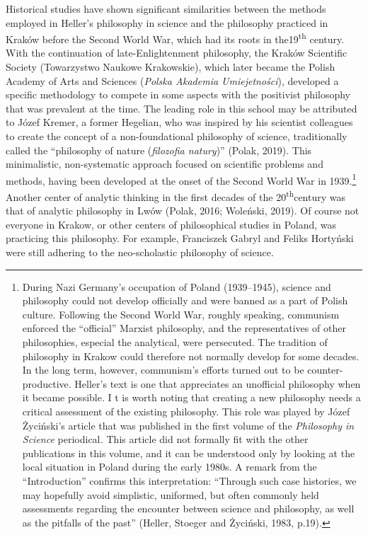 \documentclass[a4paper]{article}
\newcommand\textstyleFootnoteAnchor[1]{\textsuperscript{#1}}
\begin{document}
Historical studies have shown significant similarities between the methods employed in Heller’s philosophy in science
and the philosophy practiced in Kraków before the Second World War, which had its roots in the19\textsuperscript{th}
century. With the continuation of late-Enlightenment philosophy, the Kraków Scientific Society (Towarzystwo Naukowe
Krakowskie), which later became the Polish Academy of Arts and Sciences (\textit{Polska Akademia Umiejetności}),
developed a specific methodology to compete in some aspects with the positivist philosophy that was prevalent at the
time. The leading role in this school may be attributed to Józef Kremer, a former Hegelian, who was inspired by his
scientist colleagues to create the concept of a non-foundational philosophy of science, traditionally called the
“philosophy of nature (\textit{filozofia natury})” (Polak, 2019). This minimalistic, non-systematic approach focused on
scientific problems and methods, having been developed at the onset of the Second World War in 1939.\footnote{During
Nazi Germany’s occupation of Poland (1939–1945), science and philosophy could not develop officially and were banned as
a part of Polish culture. Following the Second World War, roughly speaking, communism enforced the “official” Marxist
philosophy, and the representatives of other philosophies, especial the analytical, were persecuted. The tradition of
philosophy in Krakow could therefore not normally develop for some decades. In the long term, however, communism’s
efforts turned out to be counter-productive. Heller’s text is one that appreciates an unofficial philosophy when it
became possible. I t is worth noting that creating a new philosophy needs a critical assessment of the existing
philosophy. This role was played by Józef Życiński's article that was published in the first volume of the
\textit{Philosophy in Science }periodical\textit{.} This article did not formally fit with the other publications in
this volume, and it can be understood only by looking at the local situation in Poland during the early 1980s. A remark
from the “Introduction” confirms this interpretation: “Through such case histories, we may hopefully avoid simplistic,
uniformed, but often commonly held assessments regarding the encounter between science and philosophy, as well as the
pitfalls of the past” (Heller, Stoeger and Życiński, 1983, p.19).}\textstyleFootnoteAnchor{ }Another center of analytic
thinking in the first decades of the 20\textsuperscript{th}century was that of analytic philosophy in Lwów (Polak,
2016; Woleński, 2019). Of course not everyone in Krakow, or other centers of philosophical studies in Poland, was
practicing this philosophy. For example, Franciszek Gabryl and Feliks Hortyński were still adhering to the
neo-scholastic philosophy of science.
\end{document}

